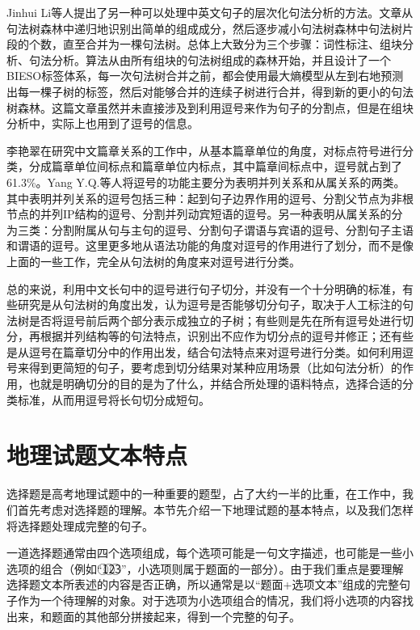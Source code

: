 \documentclass[master, winfont]{njuthesis}
\begin{document}
Jinhui Li等人\cite{Li2008}提出了另一种可以处理中英文句子的层次化句法分析的方法。文章从句法树森林中递归地识别出简单的组成成分，然后逐步减小句法树森林中句法树片段的个数，直至合并为一棵句法树。总体上大致分为三个步骤：词性标注、组块分析、句法分析。算法从由所有组块的句法树组成的森林开始，并且设计了一个BIESO标签体系，每一次句法树合并之前，都会使用最大熵模型从左到右地预测出每一棵子树的标签，然后对能够合并的连续子树进行合并，得到新的更小的句法树森林。这篇文章虽然并未直接涉及到利用逗号来作为句子的分割点，但是在组块分析中，实际上也用到了逗号的信息。

李艳翠\cite{liyancui2015}在研究中文篇章关系的工作中，从基本篇章单位的角度，对标点符号进行分类，分成篇章单位间标点和篇章单位内标点，其中篇章间标点中，逗号就占到了61.3\%。Yang Y.Q.等人\cite{Yang2012Chinese}将逗号的功能主要分为表明并列关系和从属关系的两类。其中表明并列关系的逗号包括三种：起到句子边界作用的逗号、分割父节点为非根节点的并列IP结构的逗号、分割并列动宾短语的逗号。另一种表明从属关系的分为三类：分割附属从句与主句的逗号、分割句子谓语与宾语的逗号、分割句子主语和谓语的逗号。这里更多地从语法功能的角度对逗号的作用进行了划分，而不是像上面的一些工作，完全从句法树的角度来对逗号进行分类。

总的来说，利用中文长句中的逗号进行句子切分，并没有一个十分明确的标准，有些研究是从句法树的角度出发，认为逗号是否能够切分句子，取决于人工标注的句法树是否将逗号前后两个部分表示成独立的子树；有些则是先在所有逗号处进行切分，再根据并列结构等的句法特点，识别出不应作为切分点的逗号并修正；还有些是从逗号在篇章切分中的作用出发，结合句法特点来对逗号进行分类。如何利用逗号来得到更简短的句子，要考虑到切分结果对某种应用场景（比如句法分析）的作用，也就是明确切分的目的是为了什么，并结合所处理的语料特点，选择合适的分类标准，从而用逗号将长句切分成短句。

\section{地理试题文本特点}
\label{geodatafeature}
选择题是高考地理试题中的一种重要的题型，占了大约一半的比重，在工作中，我们首先考虑对选择题的理解。本节先介绍一下地理试题的基本特点，以及我们怎样将选择题处理成完整的句子。

一道选择题通常由四个选项组成，每个选项可能是一句文字描述，也可能是一些小选项的组合（例如“\textcircled{1}\textcircled{2}\textcircled{3}”，小选项则属于题面的一部分）。由于我们重点是要理解选择题文本所表述的内容是否正确，所以通常是以“题面+选项文本”组成的完整句子作为一个待理解的对象。对于选项为小选项组合的情况，我们将小选项的内容找出来，和题面的其他部分拼接起来，得到一个完整的句子。
\end{document}
